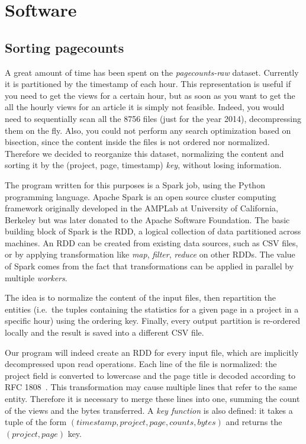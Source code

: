 

\section{Software}
\label{sec:software}
\subsection{Sorting pagecounts}
\label{sub:Sorting pagecounts}
A great amount of time has been spent on the \emph{pagecounts-raw} dataset.
Currently it is partitioned by the timestamp of each hour.
This representation is useful if you need to get the views for a certain hour, but as soon as you want to get the all the hourly views for an article it is simply not feasible.
Indeed, you would need to sequentially scan all the 8756 files (just for the year 2014), decompressing them on the fly.
Also, you could not perform any search optimization based on bisection, since the content inside the files is not ordered nor normalized.
Therefore we decided to reorganize this dataset, normalizing the content and sorting it by the (project, page, timestamp) \emph{key}, without losing information.

The program written for this purposes is a Spark job, using the Python programming language.
Apache Spark is an open source cluster computing framework originally developed in the AMPLab at University of California, Berkeley but was later donated to the Apache Software Foundation.
The basic building block of Spark is the \ac{RDD}, a logical collection of data partitioned across machines.
An \acs{RDD} can be created from existing data sources, such as \ac{CSV} files, or by applying transformation like \emph{map}, \emph{filter}, \emph{reduce} on other \acp{RDD}.
The value of Spark comes from the fact that transformations can be applied in parallel by multiple \emph{workers}.

The idea is to normalize the content of the input files, then repartition the entities (i.e.\ the tuples containing the statistics for a given page in a project in a specific hour) using the ordering key.
Finally, every output partition is re-ordered locally and the result is saved into a different CSV file.

Our program will indeed create an \ac{RDD} for every input file, which are implicitly decompressed upon read operations.
Each line of the file is normalized: the project field is converted to lowercase and the page title is decoded according to RFC 1808~\cite{rfc1808}.
This transformation may cause multiple lines that refer to the same entity.
Therefore it is necessary to merge these lines into one, summing the count of the views and the bytes transferred.
A \emph{key function} is also defined: it takes a tuple of the form $(timestamp, project, page, counts, bytes)$ and returns the $(project, page)$ key.

